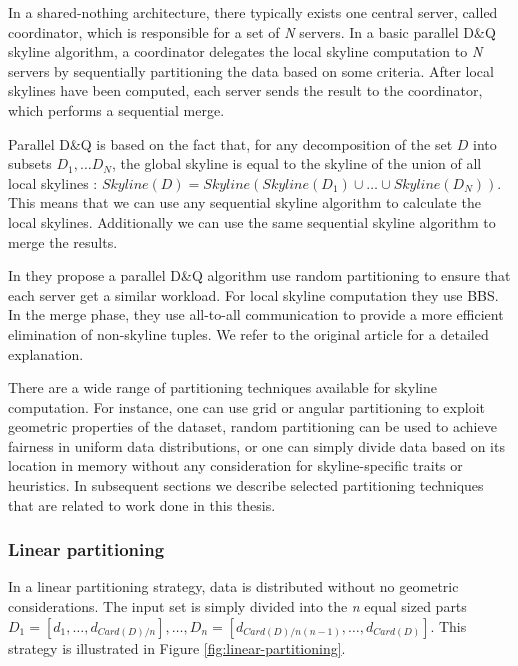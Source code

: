 \documentclass[12pt,a4paper,twoside]{report}
\begin{document}
In a shared-nothing architecture, there typically exists one
central server, called coordinator, which is responsible for a set
of \textit{N} servers. In a basic parallel D\&Q skyline algorithm,
a coordinator delegates the local skyline computation to
\textit{N} servers by sequentially partitioning the data based on
some criteria. After local skylines have been computed, each
server sends the result to the coordinator, which performs a
sequential merge.

Parallel D\&Q is based on the fact that, for any decomposition of
the set $D$ into subsets $D_1, \ldots D_N$, the global skyline is
equal to the skyline of the union of all local skylines
\cite{cosgaya2007parallel}: $Skyline(D) = Skyline(Skyline(D_1)
\cup \ldots \cup Skyline(D_N))$. This means that we can use any
sequential skyline algorithm to calculate the local skylines.
Additionally we can use the same sequential skyline algorithm to
merge the results.

In \cite{cosgaya2007parallel} they propose a parallel D\&Q
algorithm use random partitioning to ensure that each server get a
similar workload. For local skyline computation they use BBS. In
the merge phase, they use all-to-all communication to provide a
more efficient elimination of non-skyline tuples. We refer to the
original article for a detailed explanation.

There are a wide range of partitioning techniques available for
skyline computation. For instance, one can use grid or angular
partitioning to exploit geometric properties of the dataset,
random partitioning can be used to achieve fairness in uniform
data distributions, or one can simply divide data based on its
location in memory without any consideration for skyline-specific
traits or heuristics. In subsequent sections we describe selected
partitioning techniques that are related to work done in this
thesis.

\subsubsection{Linear partitioning}
\label{sec:linear-partitioning}

In a linear partitioning strategy, data is distributed without no geometric
considerations. The input set is simply divided into the \textit{n} equal
sized parts $D_1 = [ d_1, \ldots, d_{Card(D)/n} ], \ldots, D_n = [
d_{Card(D)/n(n-1)}, \ldots, d_{Card(D)} ]$. This strategy is illustrated in
Figure \ref{fig:linear-partitioning}.
\end{document}
